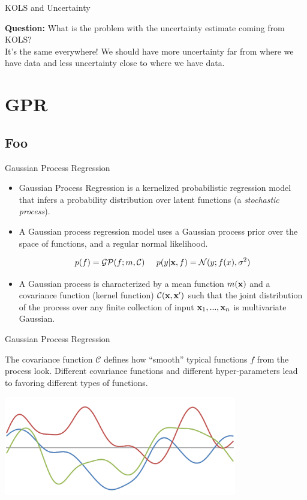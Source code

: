 \documentclass[serif,xcolor=pdftex,dvipsnames,table,hyperref={bookmarks=false,breaklinks}]{beamer}
\begin{document}
\begin{frame}[t]{KOLS and Uncertainty}

\textbf{Question:} What is the problem with the uncertainty estimate coming 
from KOLS?\\[12pt]

\pause It's the same everywhere! We should have more uncertainty far from where
we have data and less uncertainty close to where we have data.

\end{frame}



\section{GPR}
\subsection{Foo}

\begin{frame}[t]{Gaussian Process Regression}

\begin{itemize}
\item Gaussian Process Regression is a kernelized probabilistic regression model
that infers a probability distribution over latent functions (a 
\textit{stochastic process}).  

\pause \item A Gaussian process regression model uses a Gaussian process prior 
over the space of functions, and a regular normal likelihood.

$$p(f) = \mathcal{GP}(f;m,\mathcal{C})\;\;\;\;\; p(y|{\mathbf{x}},f) = 
\mathcal{N}(y;f(x),\sigma^2)$$

\pause \item A Gaussian process is characterized by a mean function 
$m({\mathbf{x}})$ and a covariance function (kernel function) 
$\mathcal{C}({\mathbf{x}},{\mathbf{x}}')$ such that the joint distribution of the process
over any finite collection of input ${\mathbf{x}}_1,...,{\mathbf{x}}_n$ is multivariate 
Gaussian. 

\end{itemize}

\end{frame}

\begin{frame}[t]{Gaussian Process Regression}

The covariance function $\mathcal{C}$ defines how ``smooth'' typical
functions $f$ from the process look. Different covariance functions
and different hyper-parameters lead to favoring different types of functions.

\includegraphics[width=4in]{../Figures/GPsamples1.png}

\end{frame}
\end{document}
